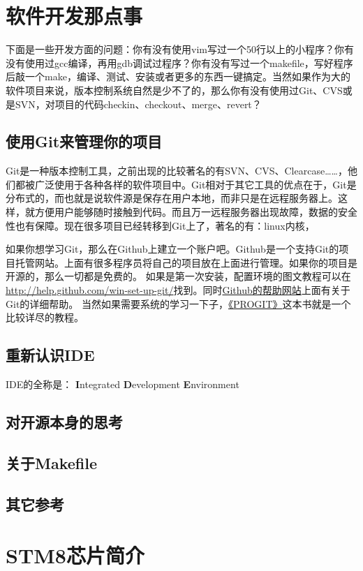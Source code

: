 \documentclass[a4paper]{book}
\newcommand{\chap}[1]{\newpage\thispagestyle{empty}\chapter{#1}\label{chap:\thechapter}}
\begin{document}
\chap{软件开发那点事}

下面是一些开发方面的问题：你有没有使用vim写过一个50行以上的小程序？你有没有使用过gcc编译，再用gdb调试过程序？你有没有写过一个makefile，写好程序后敲一个make，编译、测试、安装或者更多的东西一键搞定。当然如果作为大的软件项目来说，版本控制系统自然是少不了的，那么你有没有使用过Git、CVS或是SVN，对项目的代码checkin、checkout、merge、revert？

\section{使用Git来管理你的项目}

Git是一种版本控制工具，之前出现的比较著名的有SVN、CVS、Clearcase\ldots{}\ldots{}，他们都被广泛使用于各种各样的软件项目中。Git相对于其它工具的优点在于，Git是分布式的，而也就是说软件源是保存在用户本地，而非只是在远程服务器上。这样，就方便用户能够随时接触到代码。而且万一远程服务器出现故障，数据的安全性也有保障。现在很多项目已经转移到Git上了，著名的有：linux内核，

如果你想学习Git，那么在Github上建立一个账户吧。Github是一个支持Git的项目托管网站。上面有很多程序员将自己的项目放在上面进行管理。如果你的项目是开源的，那么一切都是免费的。 如果是第一次安装，配置环境的图文教程可以在\url{http://help.github.com/win-set-up-git/}找到。同时\href{http://help.github.com/}{Github的帮助网站}上面有关于Git的详细帮助。 当然如果需要系统的学习一下子，\href{http://progit.org/}{《PROGIT》}这本书就是一个比较详尽的教程。

\section{重新认识IDE}

IDE的全称是： \textbf{I}ntegrated \textbf{D}evelopment \textbf{E}nvironment

\section{对开源本身的思考}

\section{关于Makefile}

\section{其它参考}

\chap{STM8芯片简介}
\end{document}
